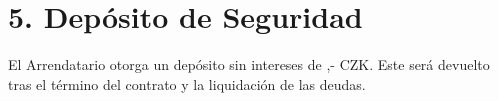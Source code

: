 \section*{5. Depósito de Seguridad}
El Arrendatario otorga un depósito sin intereses de \DepositAmount,- CZK. Este será devuelto tras el término del contrato y la liquidación de las deudas.
